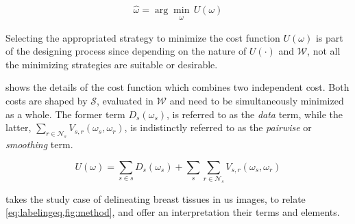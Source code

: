 \begin{equation}
\hat{\omega} = \arg \min_{\substack{\omega}} \,U(\omega)
\label{eq:costmin}
\end{equation}

Selecting the appropriated strategy to minimize the cost function $U(\omega)$ is part of the designing process since depending on the nature of $U(\cdot)$ and $\mathcal{W}$, not all the minimizing strategies are suitable or desirable.

 shows the details of the cost function which combines two independent cost.
Both costs are shaped by $\mathcal{S}$, evaluated in $\mathcal{W}$ and need to be simultaneously minimized as a whole.
The former term $D_s(\omega_s)$, is referred to as the \emph{data} term, while the latter, $\sum_{r \in \mathcal{N}_{s}} V_{s,r}(\omega_s,\omega_r)$, is indistinctly referred to as the \emph{pairwise} or \emph{smoothing} term.

\begin{equation}
  U(\omega) = \sum_{s\in s} D_s(\omega_s) + \sum_{s}\sum_{r \in \mathcal{N}_{s}} V_{s,r}(\omega_s,\omega_r)
  \label{eq:labelingeq}
\end{equation}

 takes the study case of delineating breast tissues in \ac{us} images, to relate \cref{eq:labelingeq,fig:method}, and offer an interpretation their terms and elements. 


